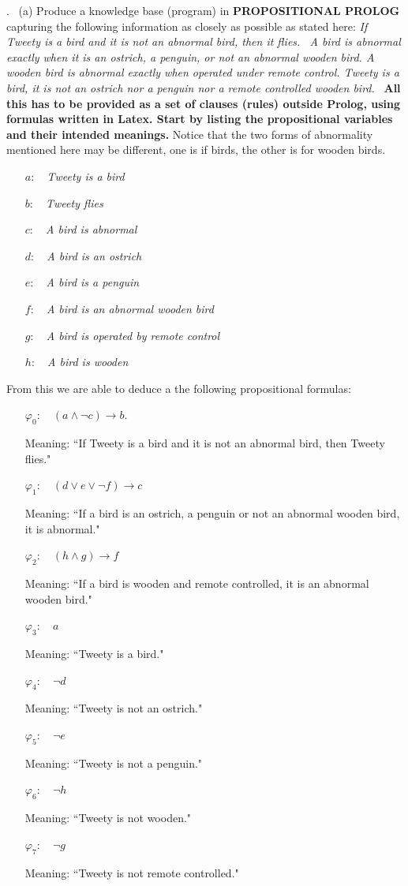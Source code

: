 \documentclass[fullpage]{article}
\begin{document}
. \ (a) Produce a knowledge base (program) in {\bf PROPOSITIONAL PROLOG} capturing the following information as closely as possible as stated here: {\em If Tweety is a bird and it is not an abnormal bird, then it flies. \
A bird is abnormal exactly when it is an ostrich, a penguin, or not an abnormal wooden bird. A wooden bird is abnormal exactly when operated under remote control. Tweety is a bird, it is  not
an ostrich nor a penguin nor a remote controlled wooden bird.}  \ {\bf All this has to be provided as a set of clauses (rules) outside Prolog, using formulas written in Latex. Start by listing the propositional variables and their intended meanings.} Notice that the two forms of abnormality mentioned here may be different, one is if birds, the other is for wooden birds.\\
\begin{itemize}
\item[$a$:]~ {\em Tweety is a bird}
\item[$b$:]~ {\em Tweety flies}
\item[$c$:]~ {\em A bird is abnormal}
\item[$d$:]~ {\em A bird is an ostrich}
\item[$e$:]~ {\em A bird is a penguin}
\item[$f$:]~ {\em A bird is an abnormal wooden bird}
\item[$g$:]~ {\em A bird is operated by remote control}
\item[$h$:]~ {\em A bird is wooden}
\end{itemize}
From this we are able to deduce a the following propositional formulas:
\begin{itemize}
\item[$\varphi_0$:]~ ${(a \wedge \neg c) \rightarrow b}$.

 Meaning: ``If Tweety is a bird and it is not an abnormal bird, then Tweety flies."
\item[$\varphi_1$:]~ ${(d \lor e \lor \neg f) \rightarrow c}$

     Meaning: ``If a bird is an ostrich, a penguin or not an abnormal wooden bird, it is abnormal."
\item[$\varphi_2$:]~ ${(h \wedge g) \rightarrow f}$

 Meaning: ``If a bird is wooden and remote controlled, it is an abnormal wooden bird."
\item[$\varphi_3$:]~ ${a}$

 Meaning: ``Tweety is a bird."
\item[$\varphi_4$:]~ ${\neg d}$

 Meaning: ``Tweety is not an ostrich."
\item[$\varphi_5$:]~ ${\neg e}$

 Meaning: ``Tweety is not a penguin."
\item[$\varphi_6$:]~ ${\neg h}$

 Meaning: ``Tweety is not wooden."
\item[$\varphi_7$:]~ ${\neg g}$

 Meaning: ``Tweety is not remote controlled."
\end{itemize}
\end{document}
